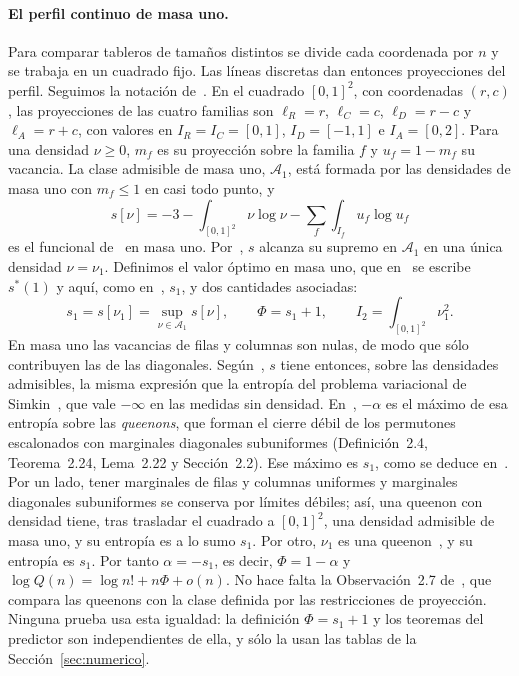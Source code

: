 \paragraph{El perfil continuo de masa uno.}
Para comparar tableros de tamaños distintos se divide cada coordenada por $n$ y se
trabaja en un cuadrado fijo. Las líneas discretas dan entonces proyecciones del perfil.
Seguimos la notación de~\cite{Perfil}. En el cuadrado $[0,1]^2$, con coordenadas $(r,c)$, las
proyecciones de las cuatro familias son $\ell_R=r$, $\ell_C=c$, $\ell_D=r-c$ y $\ell_A=r+c$, con
valores en $I_R=I_C=[0,1]$, $I_D=[-1,1]$ e $I_A=[0,2]$. Para una densidad $\nu\ge0$, $m_f$ es su
proyección sobre la familia $f$ y $u_f=1-m_f$ su vacancia. La clase admisible de masa uno,
$\mathcal A_1$, está formada por las densidades de masa uno con $m_f\le1$ en casi todo punto, y
\[
 s[\nu]=-3-\int_{[0,1]^2}\nu\log\nu-\sum_{f}\int_{I_f}u_f\log u_f
\]
es el funcional de~\cite[(1.1)]{Perfil} en masa uno. Por~\cite[Teorema~1.1]{Perfil}, $s$ alcanza su
supremo en $\mathcal A_1$ en una única densidad $\nu=\nu_1$. Definimos el valor óptimo en masa
uno, que en~\cite{Perfil} se escribe $s^*(1)$ y aquí, como en~\cite{Completabilidad}, $s_1$, y dos
cantidades asociadas:
\begin{equation}\label{eq:s1}
 s_1=s[\nu_1]=\sup_{\nu\in\mathcal A_1}s[\nu],\qquad \Phi=s_1+1,\qquad I_2=\int_{[0,1]^2}\nu_1^2 .
\end{equation}
En masa uno las vacancias de filas y columnas son nulas, de modo que sólo contribuyen las de las
diagonales. Según~\cite[Observación~2.3]{Perfil}, $s$ tiene entonces, sobre las densidades admisibles,
la misma expresión que la entropía del problema variacional de
Simkin~\cite[Definición~2.9]{Simkin}, que vale $-\infty$ en las medidas sin densidad.
En~\cite{Simkin}, $-\alpha$ es el máximo de esa entropía sobre las \emph{queenons}, que forman el
cierre débil de los permutones escalonados con marginales diagonales subuniformes (Definición~2.4,
Teorema~2.24, Lema~2.22 y Sección~2.2). Ese máximo es $s_1$, como se deduce
en~\cite[Sección~2.4]{Completabilidad}. Por un lado, tener marginales de
filas y columnas uniformes y marginales diagonales subuniformes se conserva por límites débiles;
así, una queenon con densidad tiene, tras trasladar el cuadrado a $[0,1]^2$, una densidad admisible
de masa uno, y su entropía es a lo sumo $s_1$. Por otro, $\nu_1$ es una
queenon~\cite[Lema~2.4]{Completabilidad}, y su entropía es $s_1$. Por tanto $\alpha=-s_1$, es
decir, $\Phi=1-\alpha$ y $\log Q(n)=\log n!+n\Phi+o(n)$. No hace falta la Observación~2.7
de~\cite{Simkin}, que compara las queenons con la clase definida por las restricciones de
proyección. Ninguna prueba usa esta igualdad: la definición $\Phi=s_1+1$ y los teoremas del
predictor son independientes de ella, y sólo la usan las tablas de la Sección~\ref{sec:numerico}.

